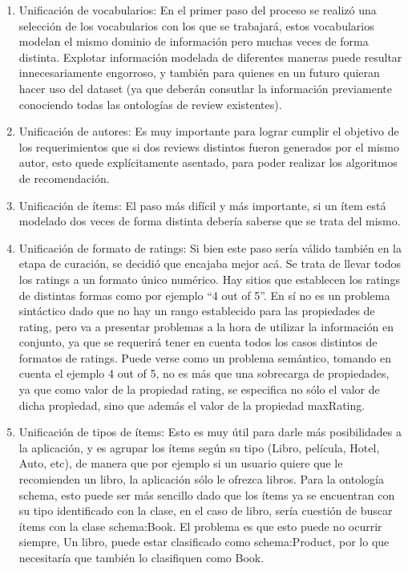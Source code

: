 \begin{enumerate}
 \item \label{item:vocUnif} Unificación de vocabularios: En el primer paso del proceso se realizó una selección de los vocabularios con los que se trabajará, 
estos vocabularios modelan el mismo dominio de información pero muchas veces de forma distinta. Explotar información modelada de 
diferentes maneras puede resultar innecesariamente engorroso, y también para quienes en un futuro quieran hacer uso del dataset (ya que
deberán consutlar la información previamente conociendo todas las ontologías de review existentes).
\item \label{item:autUnif} Unificación de autores: Es muy importante para lograr cumplir el objetivo de los requerimientos que si dos reviews distintos fueron 
generados por el mismo autor, esto quede explícitamente asentado, para poder realizar los algoritmos de recomendación.
\item \label{item:itUnif} Unificación de ítems: El paso más difícil y más importante, si un ítem está modelado dos veces de forma distinta debería saberse que 
se trata del mismo.
\item \label{item:forUnif} Unificación de formato de ratings: Si bien este paso sería válido también en la etapa de curación, se decidió que encajaba mejor acá.
Se trata de llevar todos los ratings a un formato único numérico. Hay sitios que establecen los ratings de distintas formas como 
por ejemplo ``4 out of 5''. En sí no es un problema sintáctico dado que no hay un rango establecido para las propiedades de rating, 
pero va a presentar problemas a la hora de utilizar la información en conjunto, ya que se requerirá tener en cuenta todos los casos 
distintos de formatos de ratings. Puede verse como un problema semántico, tomando en cuenta el ejemplo 4 out of 5, no es más que una sobrecarga de 
propiedades, ya que como valor de la propiedad rating, se especifica no sólo el valor de dicha propìedad, sino que además el valor de la 
propiedad maxRating.
\item \label{item:tipUnif} Unificación de tipos de ítems: Esto es muy útil para darle más posibilidades a la aplicación, y es agrupar los ítems según su tipo 
(Libro, película, Hotel, Auto, etc), de manera que por ejemplo si un usuario quiere que le recomienden un libro, la aplicación sólo 
le ofrezca libros. Para la ontología schema, esto puede ser más sencillo dado que los ítems ya se encuentran con su tipo identificado con 
la clase, en el caso de libro, sería cuestión de buscar ítems con la clase schema:Book. El problema es que esto puede no ocurrir siempre, 
Un libro, puede estar clasificado como schema:Product, por lo que necesitaría que también lo clasifiquen como Book.
\end{enumerate}

